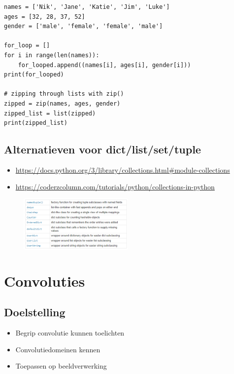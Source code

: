 \documentclass{article}
\begin{document}
\begin{verbatim}
names = ['Nik', 'Jane', 'Katie', 'Jim', 'Luke']
ages = [32, 28, 37, 52]
gender = ['male', 'female', 'female', 'male']

for_loop = []
for i in range(len(names)):
    for_looped.append((names[i], ages[i], gender[i]))
print(for_looped)

# zipping through lists with zip()
zipped = zip(names, ages, gender)
zipped_list = list(zipped)
print(zipped_list)
\end{verbatim}

\subsection{Alternatieven voor dict/list/set/tuple}

\begin{itemize}
    \item \url{https://docs.python.org/3/library/collections.html#module-collections}
    \item \url{https://coderzcolumn.com/tutorials/python/collections-in-python}
\end{itemize}


\begin{figure}[H]
    \centering
    \includegraphics[width=0.5\textwidth]{collections.png}
    \caption{}
\end{figure}

\section{Convoluties}

\subsection{Doelstelling}

\begin{itemize}
    \item Begrip convolutie kunnen toelichten
    \item Convolutiedomeinen kennen
    \item Toepassen op beeldverwerking
\end{itemize}
\end{document}
